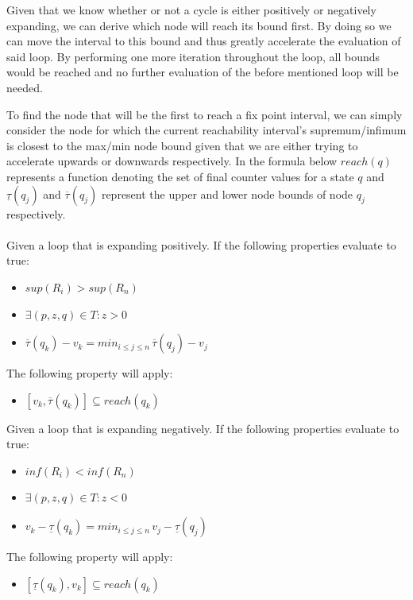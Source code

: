 \documentclass[12pt]{thesis}
\begin{document}
Given that we know whether or not a cycle is either positively or negatively expanding, we can derive which node will reach its bound first. By doing so we can move the interval to this bound and thus greatly accelerate the evaluation of said loop. By performing one more iteration throughout the loop, all bounds would be reached and no further evaluation of the before mentioned loop will be needed.

To find the node that will be the first to reach a fix point interval, we can simply consider the node for which the current reachability interval's supremum/infimum is closest to the max/min node bound given that we are either trying to accelerate upwards or downwards respectively. In the formula below $reach(q)$ represents a function denoting the set of final counter values for a state $q$ and $\underline{\tau}(q_j)$ and $\overline{\tau}(q_j)$ represent the upper and lower node bounds of node $q_j$ respectively.\\
\\
\noindent
Given a loop that is expanding positively. If the following properties evaluate to true:

\begin{itemize}
	\item $sup(R_i) > sup(R_n)$
	\item $\exists (p, z, q) \in T: z > 0$
	\item $\overline{\tau}(q_k) - v_k = min_{i\leq j \le n}\,\overline{\tau}(q_j) - v_j$
\end{itemize}
The following property will apply:
\begin{itemize}
	\item $[v_k, \overline{\tau}(q_k)] \subseteq reach(q_k)$
\end{itemize}


\noindent
Given a loop that is expanding negatively. If the following properties evaluate to true:

\begin{itemize}
	\item $inf(R_i) < inf(R_n)$
	\item $\exists (p, z, q) \in T: z < 0$
	\item $v_k - \underline{\tau}(q_k) = min_{i\leq j \le n}\,v_j - \underline{\tau}(q_j)$
\end{itemize}
The following property will apply:
\begin{itemize}
	\item $[\underline{\tau}(q_k), v_k] \subseteq reach(q_k)$
\end{itemize}
\end{document}
